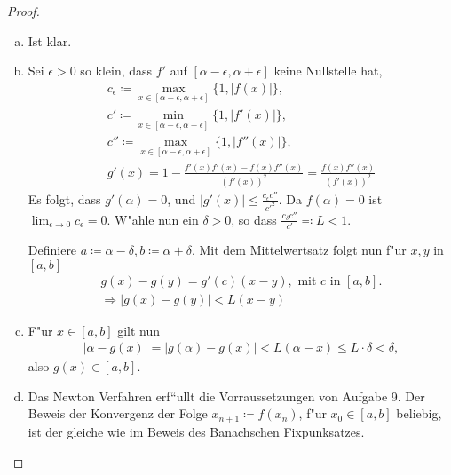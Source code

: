 \documentclass[a4paper,10pt]{article}
\begin{document}
\begin{proof}\leavevmode
 \begin{enumerate}[(a)]
  \item Ist klar.
  \item Sei $\epsilon>0$ so klein, dass $f'$ auf $\left[ \alpha - \epsilon, \alpha + \epsilon \right]$
   keine Nullstelle hat,  
   \begin{gather*}
   c_\epsilon \coloneqq \max_{x \in \left[\alpha -\epsilon, \alpha +\epsilon \right]} \{ 1, |f(x)| \}, \\
   c' \coloneqq \min_{x \in \left[\alpha - \epsilon, \alpha +\epsilon \right]}\{ 1, |f'(x)| \},\\ 
   c'' \coloneqq \max_{x \in \left[\alpha -\epsilon, \alpha +\epsilon \right]} \{ 1, |f''(x)| \} ,\\
   g'(x)  = 1- \frac{f'(x)f'(x)- f(x)f''(x)}{(f'(x))^2} = \frac{f(x)f''(x)}{(f'(x))^2} 
   \end{gather*}
  Es folgt, dass $g'(\alpha) = 0$, und 
  $|g'(x)| \leq  \frac{c_\epsilon c''}{c'^2}$. Da $f(\alpha)=0$ ist $\lim_{\epsilon
  \to 0} c_\epsilon = 0$. W"ahle nun ein $\delta > 0$, so dass $\frac{c_\delta c''}{c'} \eqqcolon L <1$.
  
  Definiere $a\coloneqq \alpha - \delta, b \coloneqq \alpha + \delta$. Mit dem Mittelwertsatz folgt nun 
  f"ur $x, y$ in $\left[a, b\right]$
  \begin{gather*}
   g(x) - g(y) = g'(c)(x-y), \text{ mit } c \text{ in } \left[a, b\right]. \\
   \Rightarrow|g(x) - g(y)| < L(x-y)
  \end{gather*}

  \item F"ur $x \in \left[a, b\right]$ gilt nun
  \begin{gather*}
   |\alpha- g(x)| = |g(\alpha) - g(x)| < L(\alpha - x) \leq L \cdot \delta < \delta,
  \end{gather*}
  also $g(x) \in \left[a, b\right]$.
  
  \item Das Newton Verfahren erf``ullt die Vorraussetzungen von Aufgabe 9. Der Beweis
  der Konvergenz der 
  Folge $x_{n+1} \coloneqq f(x_n)$, f"ur $x_0 \in \left[a, b\right]$ beliebig, ist der
  gleiche wie im Beweis des Banachschen Fixpunksatzes.

 \end{enumerate}

\end{proof}
\end{document}
